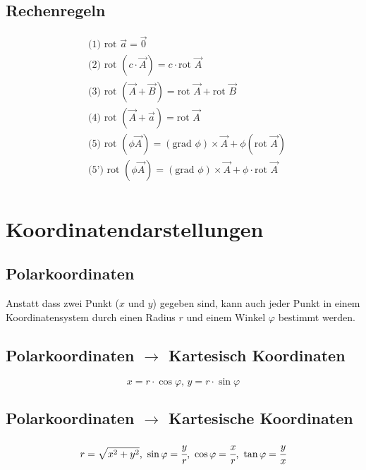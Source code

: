 \documentclass[a4paper,10pt]{scrartcl}
\begin{document}
        \subsection*{Rechenregeln}
        \begin{equation*}
            \begin{aligned}
                & \text{(1) rot }  \vec{a} = \vec{0} \\
                & \text{(2) rot }  (c \cdot \vec{A}) = c \cdot \text{rot } \vec{A} \\
                & \text{(3) rot }  (\vec{A} + \vec{B}) = \text{rot } \vec{A} + \text{rot } \vec{B} \\
                & \text{(4) rot }  (\vec{A} + \vec{a}) = \text{rot } \vec{A} \\
                & \text{(5) rot }  (\phi \vec{A})= (\text{grad }  \phi) \times \vec{A} + \phi(\text{rot } \vec{A}) \\
                & \text{(5') rot }  (\phi \vec{A})= (\text{grad }  \phi) \times \vec{A} + \phi \cdot \text{rot } \vec{A} \\
            \end{aligned}
        \end{equation*}

    \section{Koordinatendarstellungen}
        \subsection{Polarkoordinaten}
        Anstatt dass zwei Punkt (\(x \text{ und } y\)) gegeben  sind, kann auch jeder Punkt in einem Koordinatensystem durch einen Radius \(r\) und 
        einem Winkel \(\varphi\) bestimmt werden.
        \subsection*{Polarkoordinaten \(\rightarrow\) Kartesisch Koordinaten}
            \begin{equation*}
                x = r \cdot \cos \varphi\text{, } y = r \cdot \sin \varphi  
            \end{equation*}
        \subsection*{Polarkoordinaten \(\rightarrow\) Kartesische Koordinaten}
            \begin{equation}
                r = \sqrt{x^2 + y^2} \text{, } \sin \varphi = \cfrac{y}{r} \text{, } \cos \varphi = \cfrac{x}{r} \text{, } \tan \varphi = \cfrac{y}{x} 
            \end{equation}
\end{document}
